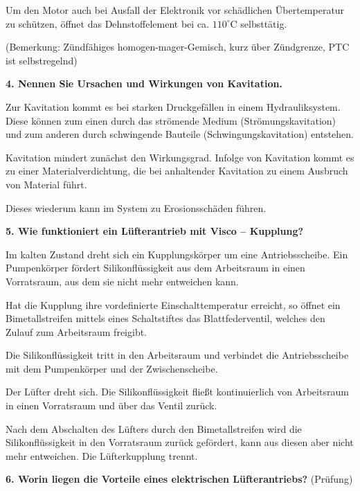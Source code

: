 Um den Motor auch bei Ausfall der Elektronik vor schädlichen
Übertemperatur zu schützen, öffnet das Dehnstoffelement bei ca.
$110^\circ\text{C}$ selbsttätig.

(Bemerkung: Zündfähiges homogen-mager-Gemisch, kurz über Zündgrenze, PTC
ist selbstregelnd)

\textbf{4. Nennen Sie Ursachen und Wirkungen von Kavitation.}

Zur Kavitation kommt es bei starken Druckgefällen in einem
Hydrauliksystem. Diese können zum einen durch das strömende Medium
(Strömungskavitation) und zum anderen durch schwingende Bauteile
(Schwingungskavitation) entstehen.

Kavitation mindert zunächst den Wirkungsgrad. Infolge von Kavitation
kommt es zu einer Materialverdichtung, die bei anhaltender Kavitation zu
einem Ausbruch von Material führt.

Dieses wiederum kann im System zu Erosionsschäden führen.

\textbf{5. Wie funktioniert ein Lüfterantrieb mit Visco -- Kupplung?}

Im kalten Zustand dreht sich ein Kupplungskörper um eine
Antriebsscheibe. Ein Pumpenkörper fördert Silikonflüssigkeit aus dem
Arbeitsraum in einen Vorratsraum, aus dem sie nicht mehr entweichen
kann.

Hat die Kupplung ihre vordefinierte Einschalttemperatur erreicht, so
öffnet ein Bimetallstreifen mittels eines Schaltstiftes das
Blattfederventil, welches den Zulauf zum Arbeitsraum freigibt.

Die Silikonflüssigkeit tritt in den Arbeitsraum und verbindet die
Antriebsscheibe mit dem Pumpenkörper und der Zwischenscheibe.

Der Lüfter dreht sich. Die Silikonflüssigkeit fließt kontinuierlich von
Arbeitsraum in einen Vorratsraum und über das Ventil zurück.

Nach dem Abschalten des Lüfters durch den Bimetallstreifen wird die
Silikonflüssigkeit in den Vorratsraum zurück gefördert, kann aus diesen
aber nicht mehr entweichen. Die Lüfterkupplung trennt.

\textbf{6. Worin liegen die Vorteile eines elektrischen Lüfterantriebs?}
(Prüfung)

